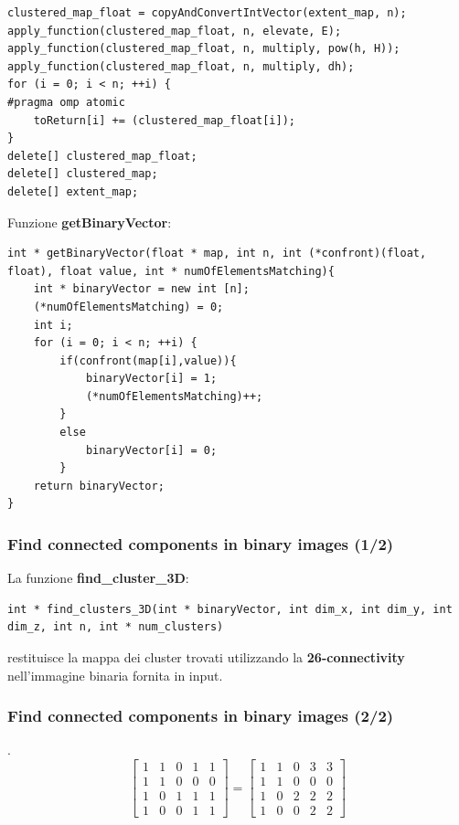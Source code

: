 \documentclass{beamer}
\begin{document}
\begin{frame}[fragile]
\begin{center}
\begin{lstlisting}
clustered_map_float = copyAndConvertIntVector(extent_map, n);
apply_function(clustered_map_float, n, elevate, E);
apply_function(clustered_map_float, n, multiply, pow(h, H));
apply_function(clustered_map_float, n, multiply, dh);
for (i = 0; i < n; ++i) {
#pragma omp atomic
    toReturn[i] += (clustered_map_float[i]);
}
delete[] clustered_map_float;
delete[] clustered_map;
delete[] extent_map;
\end{lstlisting}
\end{center}
\end{frame}

\begin{frame}[fragile]
Funzione \textbf{getBinaryVector}:
\begin{center}
\begin{lstlisting}
int * getBinaryVector(float * map, int n, int (*confront)(float, float), float value, int * numOfElementsMatching){
    int * binaryVector = new int [n];
    (*numOfElementsMatching) = 0;
    int i;
    for (i = 0; i < n; ++i) {
        if(confront(map[i],value)){
            binaryVector[i] = 1;
            (*numOfElementsMatching)++;
        }
        else
            binaryVector[i] = 0;
        }
    return binaryVector;
}
\end{lstlisting}
\end{center}
\end{frame}

\begin{frame}[fragile]
\frametitle{Find connected components in binary images (1/2)}
La funzione \textbf{find\_cluster\_3D}:\\
\begin{lstlisting}
int * find_clusters_3D(int * binaryVector, int dim_x, int dim_y, int dim_z, int n, int * num_clusters)
\end{lstlisting}

restituisce la mappa dei cluster trovati utilizzando la \textbf{26-connectivity} nell'immagine binaria fornita in input.
\end{frame}

\begin{frame}
\frametitle{Find connected components in binary images (2/2)}
.
\vfill
\[
\begin{bmatrix}
    1       & 1 & 0 & 1 & 1\\
    1       & 1 & 0 & 0 & 0 \\
    1       & 0 & 1 & 1 & 1 \\
    1       & 0 & 0 & 1 & 1
\end{bmatrix}
=
\begin{bmatrix}
    1       & 1 & 0 & 3 & 3\\
    1       & 1 & 0 & 0 & 0 \\
    1       & 0 & 2 & 2 & 2 \\
    1       & 0 & 0 & 2 & 2
\end{bmatrix}
\]
\end{frame}
\end{document}
